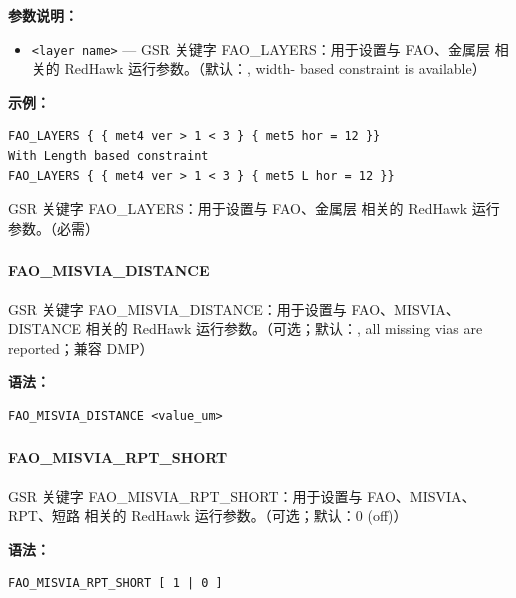 \textbf{参数说明：}
\begin{itemize}
\item \texttt{<layer name>} — GSR 关键字 FAO\_LAYERS：用于设置与 FAO、金属层 相关的 RedHawk 运行参数。（默认：, width- based constraint is available）
\end{itemize}

\textbf{示例：}
\begin{lstlisting}
FAO_LAYERS { { met4 ver > 1 < 3 } { met5 hor = 12 }}
With Length based constraint
FAO_LAYERS { { met4 ver > 1 < 3 } { met5 L hor = 12 }}
\end{lstlisting}

\begin{noteBox}
GSR 关键字 FAO\_LAYERS：用于设置与 FAO、金属层 相关的 RedHawk 运行参数。（必需）
\end{noteBox}

\subsubsection{}
\paragraph*{FAO_MISVIA_DISTANCE}

GSR 关键字 FAO_MISVIA_DISTANCE：用于设置与 FAO、MISVIA、DISTANCE 相关的 RedHawk 运行参数。（可选；默认：, all missing vias are reported；兼容 DMP）

\textbf{语法：}
\begin{lstlisting}
FAO_MISVIA_DISTANCE <value_um>
\end{lstlisting}

\subsubsection{}
\paragraph*{FAO_MISVIA_RPT_SHORT}

GSR 关键字 FAO_MISVIA_RPT_SHORT：用于设置与 FAO、MISVIA、RPT、短路 相关的 RedHawk 运行参数。（可选；默认：0 (off)）

\textbf{语法：}
\begin{lstlisting}
FAO_MISVIA_RPT_SHORT [ 1 | 0 ]
\end{lstlisting}

\subsubsection{}
